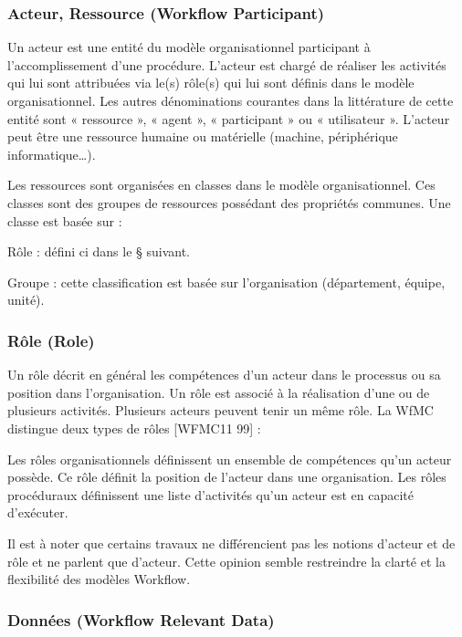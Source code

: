  	 
 	 
 	  	 \subsubsection{ Acteur, Ressource (Workflow Participant) }
 	 
 	Un acteur est une entité du modèle organisationnel participant à l’accomplissement d’une procédure. L’acteur est chargé de réaliser les activités qui lui sont attribuées via le(s) rôle(s) qui lui sont définis dans le modèle organisationnel. Les autres dénominations courantes dans la littérature de cette entité sont « ressource », « agent », « participant » ou « utilisateur ». L’acteur peut être une ressource humaine ou matérielle (machine, périphérique informatique…).
 	 
 	 Les ressources sont organisées en classes dans le modèle organisationnel. Ces classes sont des groupes de ressources possédant des propriétés communes. Une classe est basée sur :
 	 
 	  Rôle : défini ci dans le § suivant. 
 	  
 	 Groupe : cette classification est basée sur l’organisation (département, équipe, unité). 
 	 
 	 \subsubsection{ Rôle (Role) }
 	 
 	 
 	 Un rôle décrit en général les compétences d’un acteur dans le processus ou sa position dans l’organisation. Un rôle est associé à la réalisation d’une ou de plusieurs activités. Plusieurs acteurs peuvent tenir un même rôle. La WfMC distingue deux types de rôles [WFMC11 99] :
 	 
 	 Les rôles organisationnels définissent un ensemble de compétences qu’un acteur possède. Ce rôle définit la position de l’acteur dans une organisation. Les rôles procéduraux définissent une liste d’activités qu’un acteur est en capacité d’exécuter. 
 	 
 	 Il est à noter que certains travaux ne différencient pas les notions d’acteur et de rôle et ne parlent que d’acteur. Cette opinion semble restreindre la clarté et la flexibilité des modèles Workflow. 
 	 
 	 	 \subsubsection{Données (Workflow Relevant Data) }
 	 
